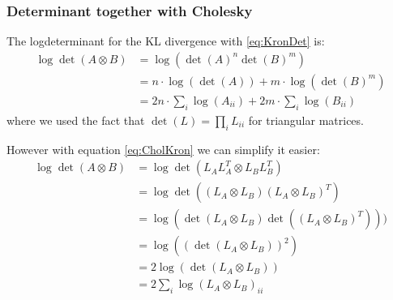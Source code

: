 \documentclass[a4paper]{scrartcl}
\begin{document}
      \subsubsection{Determinant together with Cholesky}
          The logdeterminant for the KL divergence with \ref{eq:KronDet} is:
          \begin{align}\label{eq:CholDet}
            \log \det (A \otimes B)
            &= \log (\det (A)^n \det (B)^m)\\
            &= n \cdot \log (\det (A)) + m \cdot \log ( \det (B)^m)\\
            &= 2n \cdot \sum_i \log (A_{ii}) + 2m \cdot \sum_i \log (B_{ii})
          \end{align}
          where we used the fact that $\det(L) = \prod_i L_{ii}$ for triangular matrices.

          However with equation \ref{eq:CholKron} we can simplify it easier:
          \begin{align}
            \log \det (A \otimes B)
            &= \log \det (L_AL_A^T \otimes L_BL_B^T)\\
            &= \log \det ((L_A \otimes L_B) (L_A \otimes L_B)^T)\\
            &= \log (\det (L_A \otimes L_B) \det((L_A \otimes L_B)^T)))\\
            &= \log ((\det (L_A \otimes L_B))^2)\\
            &= 2\log (\det (L_A \otimes L_B))\\
            &= 2 \sum_i \log (L_A \otimes L_B)_{ii}\\
          \end{align}
        
        
        
  
          
\end{document}

